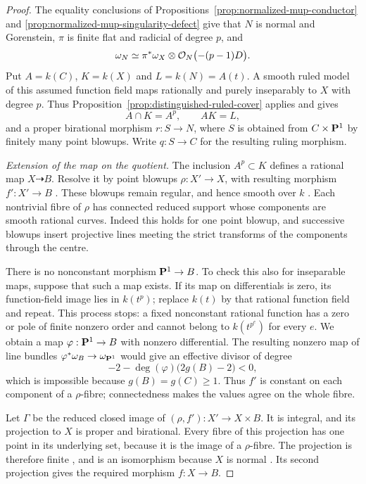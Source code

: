 \begin{proof}
The equality conclusions of
Propositions~\ref{prop:normalized-mup-conductor} and
\ref{prop:normalized-mup-singularity-defect} give that $N$ is normal
and Gorenstein, $\pi$ is finite flat and radicial of degree $p$, and
\begin{equation}\label{eq:positive-genus-canonical}
 \omega_N\simeq\pi^*\omega_X\otimes\mathcal O_N\bigl(-(p-1)D\bigr).
\end{equation}
Put $A=k(C)$, $K=k(X)$ and $L=k(N)=A(t)$.
A smooth ruled model of this assumed function field maps rationally
and purely inseparably to $X$ with degree $p$.
Thus Proposition~\ref{prop:distinguished-ruled-cover} applies and gives
\[
 A\cap K=A^p,\qquad AK=L,
\]
and a proper birational morphism $r:S\to N$, where $S$ is obtained
from $C\times\mathbf P^1$ by finitely many point blowups. Write $q:S\to C$
for the resulting ruling morphism.

\emph{Extension of the map on the quotient.}
The inclusion $A^p\subset K$ defines a rational map $X\dashrightarrow B$.
Resolve it by point blowups $\rho:X'\to X$, with resulting morphism
$f':X'\to B$ \cite[Tag~0C5H]{Stacks}. These blowups remain regular,
and hence smooth over $k$ \cite[Tags~0AGP and~0B8X]{Stacks}.
Each nontrivial fibre of $\rho$ has connected reduced support whose
components are smooth rational curves. Indeed this holds for one point
blowup, and successive blowups insert projective lines meeting the
strict transforms of the components through the centre.

There is no nonconstant morphism $\mathbf P^1\to B$. To check this also for
inseparable maps, suppose that such a map exists. If its map on
differentials is zero, its function-field image lies in $k(t^p)$;
replace $k(t)$ by that rational function field and repeat.
This process stops: a fixed nonconstant rational function has a zero
or pole of finite nonzero order and cannot belong to $k(t^{p^e})$
for every $e$. We obtain a map $\varphi:\mathbf P^1\to B$ with nonzero
differential. The resulting nonzero map of line bundles
$\varphi^*\omega_B\to\omega_{\mathbf P^1}$ would give an effective divisor
of degree
\[
 -2-\deg(\varphi)\bigl(2g(B)-2\bigr)<0,
\]
which is impossible because $g(B)=g(C)\geq1$.
Thus $f'$ is constant on each component of a $\rho$-fibre;
connectedness makes the values agree on the whole fibre.

Let $\Gamma$ be the reduced closed image of
$(\rho,f'):X'\to X\times B$. It is integral, and its projection to $X$
is proper and birational. Every fibre of this projection has one point
in its underlying set, because it is the image of a $\rho$-fibre.
The projection is therefore finite \cite[Tag~02LS]{Stacks}, and is an
isomorphism because $X$ is normal \cite[Tag~0AB1]{Stacks}.
Its second projection gives the required morphism $f:X\to B$.


\end{proof}
